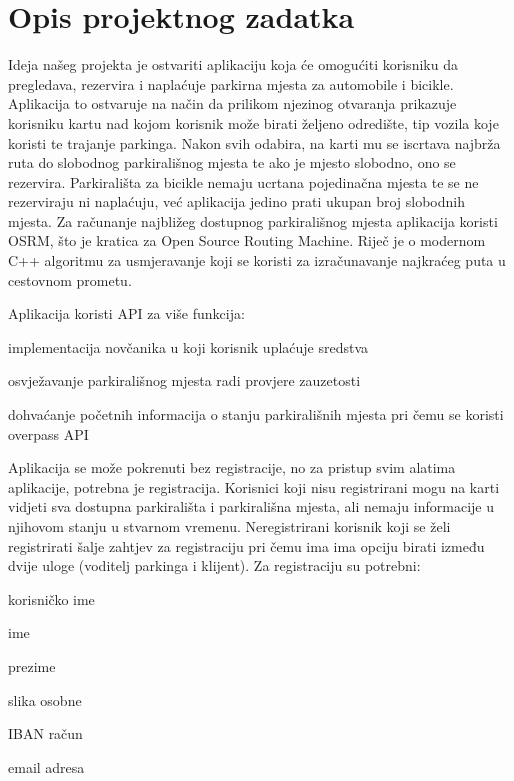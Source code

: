 \chapter{Opis projektnog zadatka}
		
		Ideja našeg projekta je ostvariti aplikaciju koja će omogućiti korisniku da pregledava, rezervira i naplaćuje parkirna mjesta za automobile i bicikle.
		Aplikacija to ostvaruje na način da prilikom njezinog otvaranja prikazuje korisniku kartu nad kojom korisnik može birati željeno odredište, tip vozila koje koristi te trajanje parkinga. Nakon svih odabira, na karti mu se iscrtava najbrža ruta do slobodnog parkirališnog mjesta te ako je mjesto slobodno, ono se rezervira. Parkirališta za bicikle nemaju ucrtana pojedinačna mjesta te se ne rezerviraju ni naplaćuju, već aplikacija jedino prati ukupan broj slobodnih mjesta.
		Za računanje najbližeg dostupnog parkirališnog mjesta aplikacija koristi OSRM, što je kratica za Open Source Routing Machine. Riječ je o modernom C++ algoritmu za usmjeravanje koji se koristi za izračunavanje najkraćeg puta u cestovnom prometu. 
		
	    \noindent Aplikacija koristi API za više funkcija:
		\begin{packed_item}
			\item implementacija novčanika u koji korisnik uplaćuje sredstva
			\item osvježavanje parkirališnog mjesta radi provjere zauzetosti
			\item dohvaćanje početnih informacija o stanju parkirališnih mjesta pri čemu se koristi overpass API
		\end{packed_item}
		 
		Aplikacija se može pokrenuti bez registracije, no za pristup svim alatima aplikacije, potrebna je registracija. Korisnici koji nisu registrirani mogu na karti vidjeti sva dostupna parkirališta i parkirališna mjesta, ali nemaju informacije u njihovom stanju u stvarnom vremenu. Neregistrirani korisnik koji se želi registrirati šalje zahtjev za registraciju pri čemu ima ima opciju birati između dvije uloge (voditelj parkinga i klijent). Za registraciju su potrebni:
		\begin{packed_item}
			\item korisničko ime
			\item ime
			\item prezime
			\item slika osobne
			\item IBAN račun
			\item email adresa
		\end{packed_item}
		
